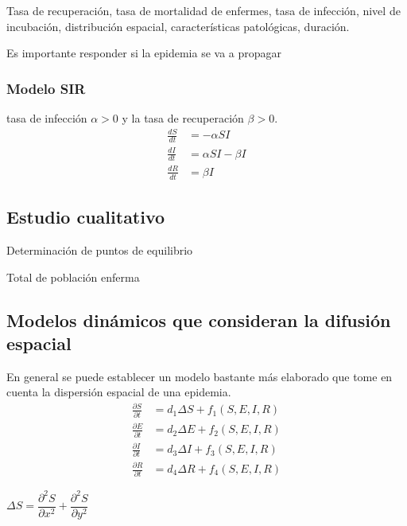 \documentclass[a4paper, 10pt, twoside]{article}
\begin{document}
Tasa de recuperación, tasa de mortalidad de enfermes, tasa de infección, nivel de incubación, 
distribución espacial, características patológicas, duración.

Es importante responder si la epidemia se va a propagar

\subsubsection{Modelo SIR}
tasa de infección $\alpha > 0$ y la tasa de recuperación $\beta > 0$.
\begin{align}
\frac{dS}{dt} & = -\alpha S I \\
\frac{dI}{dt} & = \alpha S I - \beta I \nonumber \\
\frac{dR}{dt} & = \beta I \nonumber
\end{align}

\subsection{Estudio cualitativo}

Determinación de puntos de equilibrio

Total de población enferma

\subsection{Modelos dinámicos que consideran la difusión espacial}
En general se puede establecer un modelo bastante más elaborado que tome en cuenta la dispersión 
espacial de una epidemia.
\begin{align}
\frac{\partial S}{\partial t} & = d_1 \Delta S + f_1( S, E, I, R) \\
\frac{\partial E}{\partial t} & = d_2 \Delta E + f_2( S, E, I, R) \nonumber \\
\frac{\partial I}{\partial t} & = d_3 \Delta I + f_3( S, E, I, R) \nonumber \\
\frac{\partial R}{\partial t} & = d_4 \Delta R + f_4( S, E, I, R) \nonumber
\end{align}

$\Delta S = \dfrac{\partial^2 S}{\partial x^2} + \dfrac{\partial^2 S}{\partial y^2}$
\end{document}
